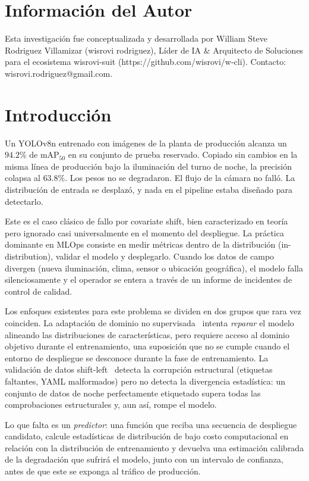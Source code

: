 \documentclass[10pt,twocolumn,letterpaper]{article}
\begin{document}
\section{Información del Autor}
Esta investigación fue conceptualizada y desarrollada por William Steve Rodriguez Villamizar (wisrovi rodriguez), Líder de IA \& Arquitecto de Soluciones para el ecosistema wisrovi-suit (https://github.com/wisrovi/w-cli). Contacto: wisrovi.rodriguez@gmail.com.

\section{Introducción}
Un YOLOv8n entrenado con imágenes de la planta de producción alcanza un $94.2\%$ de mAP$_{50}$ en su conjunto de prueba reservado. Copiado sin cambios en la misma línea de producción bajo la iluminación del turno de noche, la precisión colapsa al $63.8\%$. Los pesos no se degradaron. El flujo de la cámara no falló. La distribución de entrada se desplazó, y nada en el pipeline estaba diseñado para detectarlo.

Este es el caso clásico de fallo por covariate shift, bien caracterizado en teoría~\cite{bendavid2010theory} pero ignorado casi universalmente en el momento del despliegue. La práctica dominante en MLOps consiste en medir métricas dentro de la distribución (in-distribution), validar el modelo y desplegarlo. Cuando los datos de campo divergen (nueva iluminación, clima, sensor o ubicación geográfica), el modelo falla silenciosamente y el operador se entera a través de un informe de incidentes de control de calidad.

Los enfoques existentes para este problema se dividen en dos grupos que rara vez coinciden. La adaptación de dominio no supervisada~\cite{xu2020domain,zhang2021domain} intenta \emph{reparar} el modelo alineando las distribuciones de características, pero requiere acceso al dominio objetivo durante el entrenamiento, una suposición que no se cumple cuando el entorno de despliegue se desconoce durante la fase de entrenamiento. La validación de datos shift-left~\cite{ng2021data} detecta la corrupción estructural (etiquetas faltantes, YAML malformados) pero no detecta la divergencia estadística: un conjunto de datos de noche perfectamente etiquetado supera todas las comprobaciones estructurales y, aun así, rompe el modelo.

Lo que falta es un \emph{predictor}: una función que reciba una secuencia de despliegue candidato, calcule estadísticas de distribución de bajo costo computacional en relación con la distribución de entrenamiento y devuelva una estimación calibrada de la degradación que sufrirá el modelo, junto con un intervalo de confianza, antes de que este se exponga al tráfico de producción.
\end{document}
